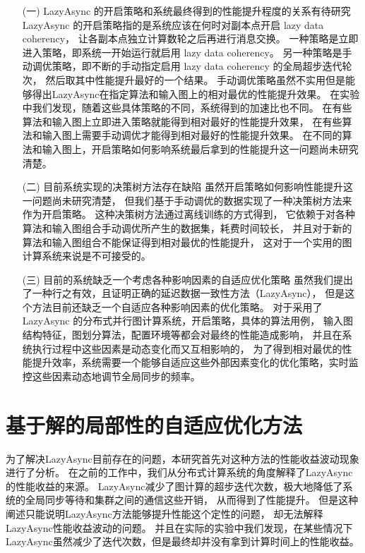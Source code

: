 \begin{enumerate}      
  \item[(一)] LazyAsync 的开启策略和系统最终得到的性能提升程度的关系有待研究 \newline\indent
    LazyAsync 的开启策略指的是系统应该在何时对副本点开启 lazy data coherency，
    让各副本点独立计算数轮之后再进行消息交换。
    一种策略是立即进入策略，即系统一开始运行就启用 lazy data coherency。
    另一种策略是手动调优策略，即不断的手动指定启用 lazy data coherency 的全局超步迭代轮次，
    然后取其中性能提升最好的一个结果。
    手动调优策略虽然不实用但是能够得出LazyAsync在指定算法和输入图上的相对最优的性能提升效果。
    在实验中我们发现，随着这些具体策略的不同，系统得到的加速比也不同。
    在有些算法和输入图上立即进入策略就能得到相对最好的性能提升效果，
    在有些算法和输入图上需要手动调优才能得到相对最好的性能提升效果。
    在不同的算法和输入图上，开启策略如何影响系统最后拿到的性能提升这一问题尚未研究清楚。

  \item[(二)] 目前系统实现的决策树方法存在缺陷 \newline\indent
    虽然开启策略如何影响性能提升这一问题尚未研究清楚，
    但我们基于手动调优的数据实现了一种决策树方法来作为开启策略。
    这种决策树方法通过离线训练的方式得到，
    它依赖于对各种算法和输入图组合手动调优所产生的数据集，耗费时间较长，
    并且对于新的算法和输入图组合不能保证得到相对最优的性能提升，
    这对于一个实用的图计算系统来说是不可接受的。

  \item[(三)] 目前的系统缺乏一个考虑各种影响因素的自适应优化策略 \newline\indent
    虽然我们提出了一种行之有效，且证明正确的延迟数据一致性方法（LazyAsync），
    但是这个方法目前还缺乏一个自适应各种影响因素的优化策略。
    对于采用了 LazyAsync 的分布式并行图计算系统，开启策略，具体的算法用例，
    输入图结构特征，图划分算法，配置环境等都会对最终的性能造成影响，
    并且在系统执行过程中这些因素是动态变化而又互相影响的，
    为了得到相对最优的性能提升效率，系统需要一个能够自适应这些外部因素变化的优化策略，实时监控这些因素动态地调节全局同步的频率。          
\end{enumerate}
\section{基于解的局部性的自适应优化方法}
为了解决LazyAsync目前存在的问题，本研究首先对这种方法的性能收益波动现象进行了分析。
在之前的工作中，我们从分布式计算系统的角度解释了LazyAsync的性能收益的来源。
LazyAsync减少了图计算的超步迭代次数，极大地降低了系统的全局同步等待和集群之间的通信这些开销，
从而得到了性能提升。
但是这种阐述只能说明LazyAsync方法能够提升性能这个定性的问题，
却无法解释LazyAsync性能收益波动的问题。
并且在实际的实验中我们发现，在某些情况下LazyAsync虽然减少了迭代次数，但是最终却并没有拿到计算时间上的性能收益。

